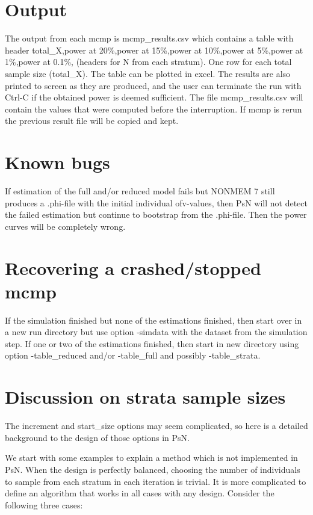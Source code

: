 \section{Output}
The output from each mcmp is mcmp\_results.csv which contains a table with header 
total\_X,power at 20\%,power at 15\%,power at 10\%,power at 5\%,power at 1\%,power at 0.1\%, (headers for N from each stratum). 
One row for each total sample size (total\_X). The table can be plotted in excel. The results are also printed to screen as they are produced, and the user can terminate the run with Ctrl-C if the obtained power is deemed sufficient. The file mcmp\_results.csv will contain the values that were computed before the interruption. If mcmp is rerun the previous result file will be copied and kept.

\section{Known bugs}
If estimation of the full and/or reduced model fails but NONMEM 7 still produces a .phi-file with the initial individual ofv-values, 
then PsN will not detect the failed estimation but continue to bootstrap from the .phi-file. Then the power curves will be completely wrong.

\section{Recovering a crashed/stopped mcmp}
If the simulation finished but none of the estimations finished, then start over in a new run directory but use option -simdata with the dataset from the simulation step. If one or two of the estimations finished, then start in new directory using option -table\_reduced and/or -table\_full and possibly -table\_strata. 

\section{Discussion on strata sample sizes}
The increment and start\_size options may seem complicated, so here is a detailed background to the design of those options in PsN.

We start with some examples to explain a method which is not implemented in PsN. When the design is perfectly balanced, choosing the number of individuals to sample from each stratum in each iteration is trivial. It is more complicated to define an algorithm that works in all cases with any design. Consider the following three cases:

